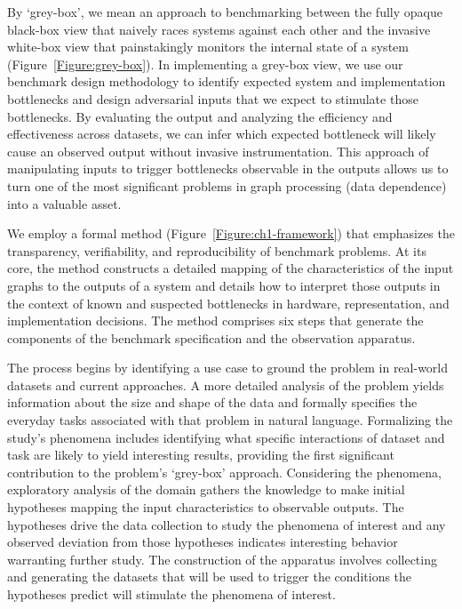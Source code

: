 By `grey-box', we mean an approach to benchmarking between the fully opaque black-box view that naively races systems against each other and the invasive white-box view that painstakingly monitors the internal state of a system (Figure~\ref{Figure:grey-box}). 
In implementing a grey-box view, we use our \gai benchmark design methodology to identify expected system and implementation bottlenecks and design adversarial inputs that we expect to stimulate those bottlenecks. 
By evaluating the output and analyzing the efficiency and effectiveness across datasets, we can infer which expected bottleneck will likely cause an observed output without invasive instrumentation.
This approach of manipulating inputs to trigger bottlenecks observable in the outputs allows us to turn one of the most significant problems in graph processing (data dependence) into a valuable asset. 

We employ a formal method (Figure~\ref{Figure:ch1-framework}) that emphasizes the transparency, verifiability, and reproducibility of benchmark problems.
At its core, the method constructs a detailed mapping of the characteristics of the input graphs to the outputs of a \gai system and details how to interpret those outputs in the context of known and suspected bottlenecks in hardware, representation, and implementation decisions.
The method comprises six steps that generate the components of the benchmark specification and the observation apparatus.

The process begins by identifying a use case to ground the problem in real-world datasets and current approaches. 
A more detailed analysis of the problem yields information about the size and shape of the data and formally specifies the everyday tasks associated with that problem in natural language. 
Formalizing the study's phenomena includes identifying what specific interactions of dataset and task are likely to yield interesting results, providing the first significant contribution to the problem's `grey-box' approach. 
Considering the phenomena, exploratory analysis of the domain gathers the knowledge to make initial hypotheses mapping the input characteristics to observable outputs. 
The hypotheses drive the data collection to study the phenomena of interest and any observed deviation from those hypotheses indicates interesting behavior warranting further study. 
The construction of the apparatus involves collecting and generating the datasets that will be used to trigger the conditions the hypotheses predict will stimulate the phenomena of interest.

